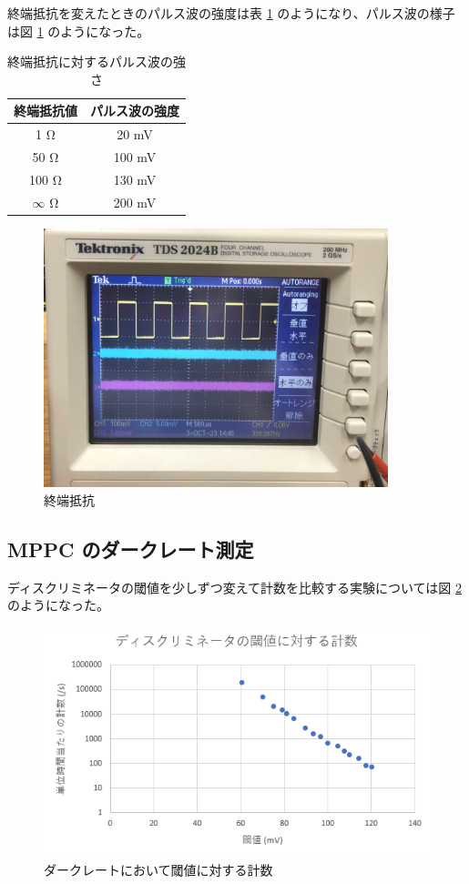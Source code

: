 \documentclass[uplatex,dvipdfmx,a4paper,11pt]{jlreq}
\numberwithin{equation}{section}
\theoremstyle{definition}
\begin{document}
終端抵抗を変えたときのパルス波の強度は表 \ref{table:resistance} のようになり、パルス波の様子は図 \ref{fig:reflection} のようになった。
\begin{table}
  \centering
  \begin{tabular}{|c|c|}
    \hline
    終端抵抗値              & パルス波の強度     \\
    \hline
    1 \si{\ohm}        & 20 \si{mV}  \\
    50 \si{\ohm}       & 100 \si{mV} \\
    100 \si{\ohm}      & 130 \si{mV} \\
    $\infty$ \si{\ohm} & 200 \si{mV} \\
    \hline
  \end{tabular}
  \caption{終端抵抗に対するパルス波の強さ}
  \label{table:resistance}
\end{table}
\begin{figure}[htbp]
  \centering
  \includegraphics[width=10cm]{./assets/reflection.jpg}
  \caption{終端抵抗}
  \label{fig:reflection}
\end{figure}


\subsection{MPPC のダークレート測定}
ディスクリミネータの閾値を少しずつ変えて計数を比較する実験については図 \ref{fig:darkrate discriminator} のようになった。
\begin{figure}[htbp]
  \centering
  \includegraphics[width=12cm]{./assets/discriminator.png}
  \caption{ダークレートにおいて閾値に対する計数}
  \label{fig:darkrate discriminator}
\end{figure}
\end{document}
